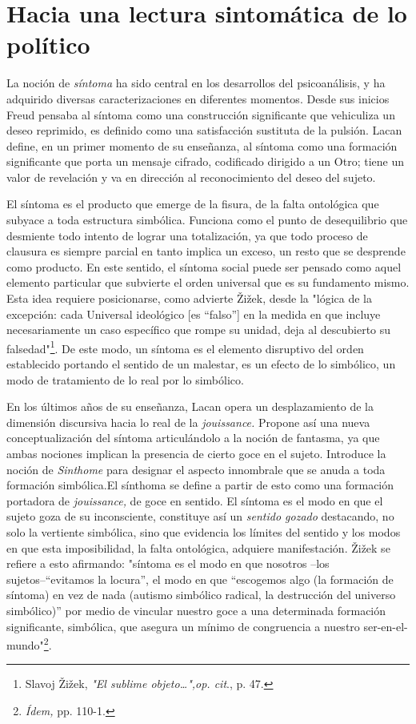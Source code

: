\section{Hacia una lectura sintomática de lo político}

La noción de \emph{síntoma} ha sido central en los desarrollos del
psicoanálisis, y ha adquirido diversas caracterizaciones en diferentes
momentos. Desde sus inicios Freud pensaba al síntoma como una
construcción significante que vehiculiza un deseo reprimido, es definido
como una satisfacción sustituta de la pulsión. Lacan define, en un
primer momento de su enseñanza, al síntoma como una formación
significante que porta un mensaje cifrado, codificado dirigido a un
Otro; tiene un valor de revelación y va en dirección al reconocimiento
del deseo del sujeto.

El síntoma es el producto que emerge de la fisura, de la falta
ontológica que subyace a toda estructura simbólica. Funciona como el
punto de desequilibrio que desmiente todo intento de lograr una
totalización, ya que todo proceso de clausura es siempre parcial en
tanto implica un exceso, un resto que se desprende como producto. En
este sentido, el síntoma social puede ser pensado como aquel elemento
particular que subvierte el orden universal que es su fundamento mismo.
Esta idea requiere posicionarse, como advierte Žižek, desde la "lógica
de la excepción: cada Universal ideológico {[}es ``falso''{]} en la
medida en que incluye necesariamente un caso específico que rompe su
unidad, deja al descubierto su falsedad"\footnote{Slavoj Žižek,
  \emph{"El sublime objeto\ldots",op. cit}., p. 47.}. De este modo, un
síntoma es el elemento disruptivo del orden establecido portando el
sentido de un malestar, es un efecto de lo simbólico, un modo de
tratamiento de lo real por lo simbólico.

En los últimos años de su enseñanza, Lacan opera un desplazamiento de la
dimensión discursiva hacia lo real de la \emph{jouissance.} Propone así
una nueva conceptualización del síntoma articulándolo a la noción de
fantasma, ya que ambas nociones implican la presencia de cierto goce en
el sujeto. Introduce la noción de \emph{Sinthome} para designar el
aspecto innombrale que se anuda a toda formación simbólica.El sínthoma
se define a partir de esto como una formación portadora de
\emph{jouissance,} de goce en sentido. El síntoma es el modo en que el
sujeto goza de su inconsciente, constituye así un \emph{sentido gozado}
destacando, no solo la vertiente simbólica, sino que evidencia los
límites del sentido y los modos en que esta imposibilidad, la falta
ontológica, adquiere manifestación. Žižek se refiere a esto afirmando:
"síntoma es el modo en que nosotros --los sujetos--``evitamos la
locura'', el modo en que ``escogemos algo (la formación de síntoma) en
vez de nada (autismo simbólico radical, la destrucción del universo
simbólico)'' por medio de vincular nuestro goce a una determinada
formación significante, simbólica, que asegura un mínimo de congruencia
a nuestro ser-en-el-mundo"\footnote{\emph{Ídem,} pp. 110-1.}.

